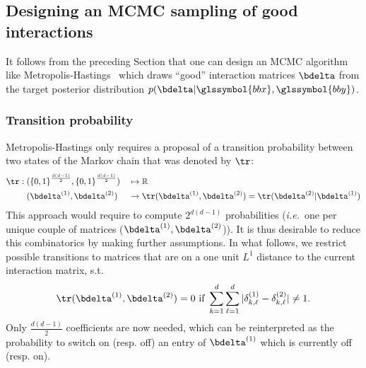 \subsection{Designing an MCMC sampling of good interactions}

It follows from the preceding Section that one can design an MCMC algorithm like Metropolis-Hastings~\cite{hastings1970monte} which draws ``good'' interaction matrices $\bdelta$ from the target posterior distribution $p(\bdelta | \glssymbol{bbx},\glssymbol{bby})$.

\subsubsection{Transition probability}

Metropolis-Hastings only requires a proposal of a transition probability between two states of the Markov chain that was denoted by $\tr$:
\begin{alignat}{2}
\tr: \; & ({\{0,1\}}^{\frac{d(d-1)}{2}},{\{0,1\}}^{\frac{d(d-1)}{2}}) && \mapsto \mathbb{R} \nonumber \\ 
& (\bdelta^{(1)},\bdelta^{(2)}) && \to \tr(\bdelta^{(1)},\bdelta^{(2)}) = \tr(\bdelta^{(2)} | \bdelta^{(1)}) \nonumber
\end{alignat}
This approach would require to compute $2^{d(d-1)}$ probabilities (\textit{i.e.}\ one per unique couple of matrices ($\bdelta^{(1)},\bdelta^{(2)}$)). It is thus desirable to reduce this combinatorics by making further assumptions. In what follows, we restrict possible transitions to matrices that are on a one unit $L^1$ distance to the current interaction matrix, s.t.\ 
\[ \tr(\bdelta^{(1)},\bdelta^{(2)}) = 0 \text{ if } \sum_{k=1}^d \sum_{\ell=1}^d |\delta^{(1)}_{k,\ell} - \delta^{(2)}_{k,\ell}| \neq 1. \]
Only $\frac{d(d-1)}{2}$ coefficients are now needed, which can be reinterpreted as the probability to switch on (resp. off) an entry of $\bdelta^{(1)}$ which is currently off (resp. on).

